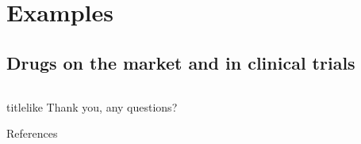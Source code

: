 \documentclass[aspectratio=169,compress]{beamer}
\renewcommand*{\bibfont}{\tiny}
\newcommand*{\autotitle}{\subsecname\hfill\textbf{\small\secname}}
\begin{document}
\section{Examples}

\subsection{Drugs on the market and in clinical trials}
\begin{frame}{\autotitle}
  \begin{columns}

  \end{columns}
\end{frame}

\begin{frame}
  \begin{beamercolorbox}[rounded=true,shadow=true,sep=8pt]{titlelike}\centering\Large
    Thank you, any questions?
  \end{beamercolorbox}
  \begin{block}{References}\bibfont
  \end{block}
\end{frame}
\end{document}
